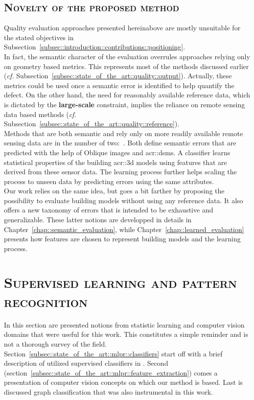     \subsection{\textsc{Novelty of the proposed method}}
        \label{subsec::state_of_the_art::quality::novelty}
        Quality evaluation approaches presented hereinabove are mostly unsuitable for the stated objectives in Subsection~\ref{subsec::introduction::contributions::positioning}.\\

        In fact, the semantic character of the evaluation overrules approaches relying only on geometry based metrics.
        This represents most of the methods discussed earlier (\textit{cf.} Subsection~\ref{subsec::state_of_the_art::quality::output}).
        Actually, these metrics could be used once a semantic error is identified to help quantify the defect.
        On the other hand, the need for reasonably available reference data, which is dictated by the \textbf{large-scale} constraint, implies the reliance on remote sensing data based methods (\textit{cf.} Subsection~\ref{subsec::state_of_the_art::quality::reference}).\\

        Methods that are both semantic and rely only on more readily available remote sensing data are in the number of two:~\textcite{boudet2006supervised,michelin2013quality}.
        Both define semantic errors that are predicted with the help of Oblique images and \glspl{acr::dsm}.
        A classifier learns statistical properties of the building \gls{acr::3d} models using features that are derived from these sensor data.
        The learning process further helps scaling the process to unseen data by predicting errors using the same attributes.\\

        Our work relies on the same idea, but goes a bit farther by proposing the possibility to evaluate building models without using any reference data.
        It also offers a new taxonomy of errors that is intended to be exhaustive and generalizable.
        These latter notions are developped in details in Chapter~\ref{chap::semantic_evaluation}, while Chapter~\ref{chap::learned_evaluation} presents how features are chosen to represent building models and the learning process.

\section{\textsc{Supervised learning and pattern recognition}}
    \label{sec::state_of_the_art::mlpr}
    In this section are presented notions from statistic learning and computer vision domains that were useful for this work.
    This constitutes a simple reminder and is not a thorough survey of the field.
    Section~\ref{subsec::state_of_the_art::mlpr::classifiers} start off with a brief description of utilized supervised classifiers in .
    Second (section~\ref{subsec::state_of_the_art::mlpr::feature_extraction}) comes a presentation of computer vision concepts on which our method is based.
    Last is discussed graph classification that was also instrumental in this work.

